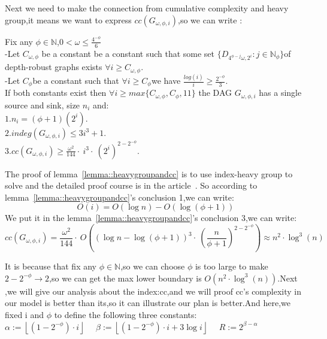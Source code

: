 Next we need to make the connection from cumulative complexity and heavy group,it means we want to express $cc(G_{\omega,\phi,i})$,so we can write : 
\begin{lemma}\label{lemma::heavygroupandcc}
  Fix any $\phi\in \mathbb N$,$0<\omega\le \frac{4^{-\phi}}{6}$\\
  -Let $C_{\omega,\phi}$ be a constant be a constant such that some set $\{D_{4^{\phi-j} \omega,2^{i}}:j\in \mathbb N_{\phi}\}$of depth-robust graphs exists $\forall i \ge C_{\omega,\phi}$.\\
  -Let $C_{\phi}$be a constant such that $\forall i \ge C_{\phi}$we have $\frac{log(i)}{i} \ge \frac{2^{-\phi}}{3}$.\\
  If both constants exist then $\forall i \ge max\{C_{\omega,\phi},C_{\phi},11\}$ the DAG $G_{\omega,\phi,i}$ has a single source and sink, size $n_i$ and:\\
  $1.n_i=(\phi+1)(2^i).$\\
  $2.indeg(G_{\omega,\phi,i})\le3i^3+1.$\\
  $3.cc(G_{\omega,\phi,i})\ge \frac{{\omega}^2}{144}\cdot~i^3\cdot~{(2^i)}^{2-2^{-\phi}}.$
\end{lemma}

The proof of lemma~\ref{lemma::heavygroupandcc} is to use index-heavy group to solve and the detailed proof course is in the article~\cite{alwen2015high}. So according to lemma~\ref{lemma::heavygroupandcc}'s conclusion 1,we can write:
\begin{equation}
  O(i)=O(\log n)-O(\log(\phi+1))
\end{equation}
We put it in the lemma~\ref{lemma::heavygroupandcc}'s conclusion 3,we can write:
\begin{equation}
  cc(G_{\omega,\phi,i})=\frac{{\omega}^2}{144}\cdot~O((\log n-\log(\phi+1))^3\cdot~{(\frac{n}{\phi+1})^{2-2^{-\phi}}})\approx n^2\cdot\log^3(n)
\end{equation}

It is because that fix any $\phi\in \mathbb N$,so we can choose $\phi$ is too large to make $2-2^{-\phi}\to 2$,so we can get the max lower boundary is $O(n^2\cdot\log^3(n))$.Next ,we will give our analysis about the index:cc,and we will proof cc's complexity in our model is better than its,so it can illustrate our plan is better.And here,we fixed i and $\phi$ to define the following three constants:\\

$\alpha :=\left\lfloor(1-2^{-\phi})\cdot i\right\rfloor$~~
$\beta :=\left\lfloor(1-2^{-\phi})\cdot i+3\log i\right\rfloor$~~
$R:=2^{\beta-\alpha}$\\

